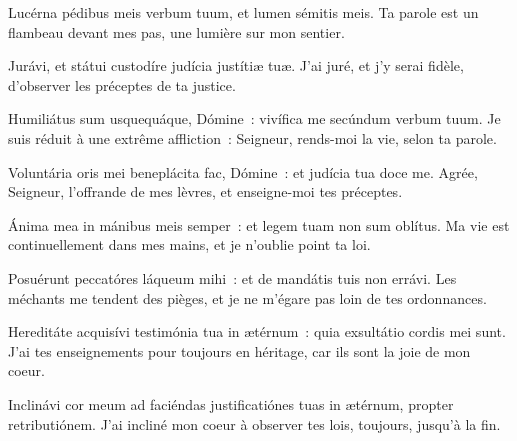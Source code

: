 
\begin{paracol}{2}

\LigneParacol{0cm}
{Lucérna pédibus meis verbum tuum, \GreStar{} et lumen sémitis meis.}
{Ta parole est un flambeau devant mes pas, une lumière sur mon sentier.}

\LigneParacol{0.2cm}
{Jurávi, et státui \GreStar{} custodíre judícia justítiæ tuæ.}
{J'ai juré, et j'y serai fidèle, d'observer les préceptes de ta justice.}

\LigneParacol{0.2cm}
{Humiliátus sum usquequáque, Dómine~: \GreStar{} vivífica me secúndum verbum tuum.}
{Je suis réduit à une extrême affliction~: Seigneur, rends-moi la vie, selon ta parole.}

\LigneParacol{0.2cm}
{Voluntária oris mei beneplácita fac, Dómine~: \GreStar{} et judícia tua doce me.}
{Agrée, Seigneur, l'offrande de mes lèvres, et enseigne-moi tes préceptes.}

\LigneParacol{0.2cm}
{Ánima mea in mánibus meis semper~: \GreStar{} et legem tuam non sum oblítus.}
{Ma vie est continuellement dans mes mains, et je n'oublie point ta loi.}

\LigneParacol{0.2cm}
{Posuérunt peccatóres láqueum mihi~: \GreStar{} et de mandátis tuis non errávi.}
{Les méchants me tendent des pièges, et je ne m'égare pas loin de tes ordonnances.}

\LigneParacol{0.2cm}
{Hereditáte acquisívi testimónia tua in ætérnum~: \GreStar{} quia exsultátio cordis mei sunt.}
{J'ai tes enseignements pour toujours en héritage, car ils sont la joie de mon coeur.}

\LigneParacol{0.2cm}
{Inclinávi cor meum ad faciéndas justificatiónes tuas in ætérnum, \GreStar{} propter retributiónem.}
{J'ai incliné mon coeur à observer tes lois, toujours, jusqu'à la fin. }

\end{paracol}
\Gloria
